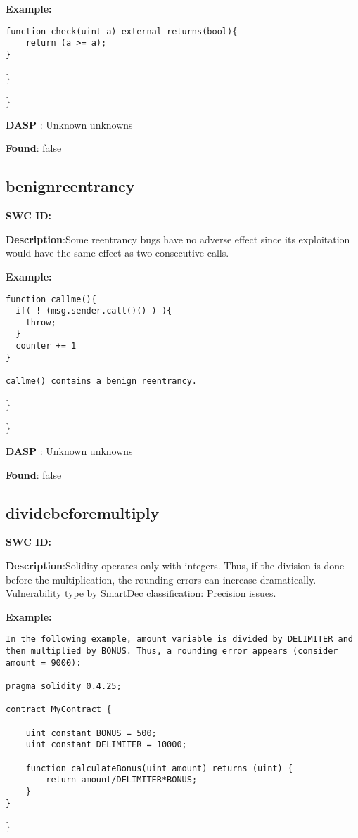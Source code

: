 \documentclass{article}
\begin{document}
\textbf{Example:} 
\begin{verbatim}
function check(uint a) external returns(bool){
    return (a >= a);
}

\end{verbatim}\} 

\} 

\textbf{DASP} : Unknown unknowns

\textbf{Found}: false

\subsection{benign\textunderscore reentrancy} 
\textbf{SWC \textunderscore ID:} 

\textbf{Description}:Some re\textendash entrancy bugs have no adverse effect since its exploitation would have the same effect as two consecutive calls.


\textbf{Example:} 
\begin{verbatim}
function callme(){
  if( ! (msg.sender.call()() ) ){
    throw;
  }
  counter += 1
}

callme() contains a benign reentrancy.

\end{verbatim}\} 

\} 

\textbf{DASP} : Unknown unknowns

\textbf{Found}: false

\subsection{divide\textunderscore before\textunderscore multiply} 
\textbf{SWC \textunderscore ID:} 

\textbf{Description}:Solidity operates only with integers. Thus, if the division is done before the multiplication, the rounding errors can increase dramatically. Vulnerability type by SmartDec classification: Precision issues.


\textbf{Example:} 
\begin{verbatim}
In the following example, amount variable is divided by DELIMITER and then multiplied by BONUS. Thus, a rounding error appears (consider amount = 9000):

pragma solidity 0.4.25;

contract MyContract {

    uint constant BONUS = 500;
    uint constant DELIMITER = 10000;

    function calculateBonus(uint amount) returns (uint) {
        return amount/DELIMITER*BONUS;
    }
}

\end{verbatim}\} 
\end{document}
